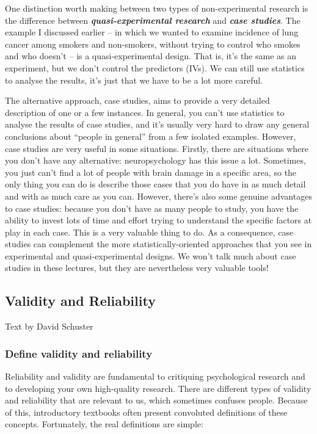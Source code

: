 \documentclass[
]{book}
\begin{document}
One distinction worth making between two types of non-experimental research is the difference between \textbf{\emph{quasi-experimental research}} and \textbf{\emph{case studies}}. The example I discussed earlier -- in which we wanted to examine incidence of lung cancer among smokers and non-smokers, without trying to control who smokes and who doesn't -- is a quasi-experimental design. That is, it's the same as an experiment, but we don't control the predictors (IVs). We can still use statistics to analyse the results, it's just that we have to be a lot more careful.

The alternative approach, case studies, aims to provide a very detailed description of one or a few instances. In general, you can't use statistics to analyse the results of case studies, and it's usually very hard to draw any general conclusions about ``people in general'' from a few isolated examples. However, case studies are very useful in some situations. Firstly, there are situations where you don't have any alternative: neuropsychology has this issue a lot. Sometimes, you just can't find a lot of people with brain damage in a specific area, so the only thing you can do is describe those cases that you do have in as much detail and with as much care as you can. However, there's also some genuine advantages to case studies: because you don't have as many people to study, you have the ability to invest lots of time and effort trying to understand the specific factors at play in each case. This is a very valuable thing to do. As a consequence, case studies can complement the more statistically-oriented approaches that you see in experimental and quasi-experimental designs. We won't talk much about case studies in these lectures, but they are nevertheless very valuable tools!

\hypertarget{validity-and-reliability}{%
\subsection{Validity and Reliability}\label{validity-and-reliability}}

Text by David Schuster

\hypertarget{define-validity-and-reliability}{%
\subsubsection{Define validity and reliability}\label{define-validity-and-reliability}}

Reliability and validity are fundamental to critiquing psychological research and to developing your own high-quality research. There are different types of validity and reliability that are relevant to us, which sometimes confuses people. Because of this, introductory textbooks often present convoluted definitions of these concepts. Fortunately, the real definitions are simple:
\end{document}
